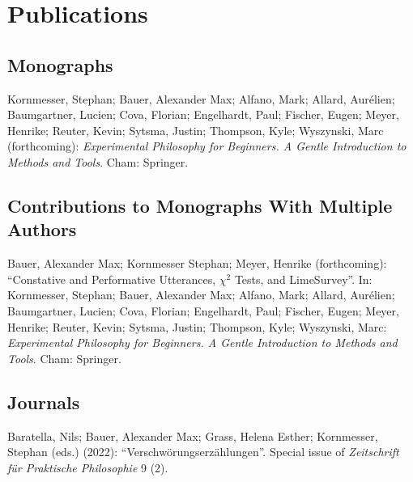 \documentclass[a4paper,10pt]{article}
\newenvironment{literature}{%
   \parskip6pt\parindent0pt\raggedright
   \def\lititem{\hangindent=1cm\hangafter1}}{%
   \par\ignorespaces}
\begin{document}
\clearpage
\section{Publications}
\subsection*{Monographs}
\begin{literature}
\lititem Kornmesser, Stephan; Bauer, Alexander Max; Alfano, Mark; Allard, Aurélien; Baumgartner, Lucien; Cova, Florian; Engelhardt, Paul; Fischer, Eugen; Meyer, Henrike; Reuter, Kevin; Sytsma, Justin; Thompson, Kyle; Wyszynski, Marc (forthcoming): \textit{Experimental Philosophy for Beginners. A Gentle Introduction to Methods and Tools}. Cham: Springer.
\end{literature}

\subsection*{Contributions to Monographs With Multiple Authors}
\begin{literature}
\lititem Bauer, Alexander Max; Kornmesser Stephan; Meyer, Henrike (forthcoming): \enquote{Constative and Performative Utterances, $\chi^2$ Tests, and LimeSurvey}. In: Kornmesser, Stephan; Bauer, Alexander Max; Alfano, Mark; Allard, Aurélien; Baumgartner, Lucien; Cova, Florian; Engelhardt, Paul; Fischer, Eugen; Meyer, Henrike; Reuter, Kevin; Sytsma, Justin; Thompson, Kyle; Wyszynski, Marc: \textit{Experimental Philosophy for Beginners. A Gentle Introduction to Methods and Tools}. Cham: Springer.
\end{literature}

\subsection*{Journals}
\begin{literature}
\lititem Baratella, Nils; Bauer, Alexander Max; Grass, Helena Esther; Kornmesser, Stephan (eds.) (2022): \enquote{Verschwörungserzählungen}. Special issue of \textit{Zeitschrift für Praktische Philosophie} 9 (2).
\end{literature}
\end{document}
